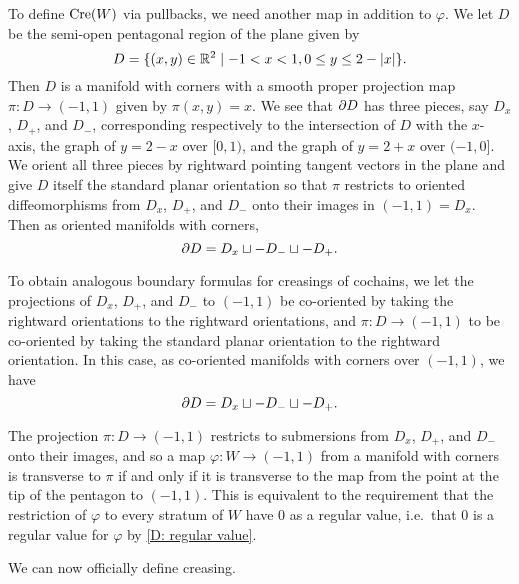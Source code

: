 To define $\mathrm{Cre}(W)$ via pullbacks, we need another map in addition to $\varphi$.
We let $D$ be the semi-open pentagonal region of the plane given by
$$D = \{(x,y) \in \mathbb{R}^2 \mid -1<x<1, 0 \leq y \leq 2-|x|\}.$$
Then $D$ is a manifold with corners with a smooth proper projection map $\pi \colon D \to (-1,1)$ given by $\pi(x,y) = x$.
We see that $\partial D$ has three pieces, say $D_x$, $D_+$, and $D_-$, corresponding respectively to the intersection of $D$ with the $x$-axis, the graph of $y = 2-x$ over $[0,1)$, and the graph of $y = 2+x$ over $(-1, 0]$.
We orient all three pieces by rightward pointing tangent vectors in the plane and give $D$ itself the standard planar orientation so that $\pi$ restricts to oriented diffeomorphisms from $D_x$, $D_+$, and $D_-$ onto their images in $(-1,1) = D_x$.
Then as oriented manifolds with corners, $$\partial D = D_x \sqcup -D_- \sqcup -D_+.$$

To obtain analogous boundary formulas for creasings of cochains, we let the projections of $D_x$, $D_+$, and $D_-$ to $(-1,1)$ be co-oriented by taking the rightward orientations to the rightward orientations, and $\pi \colon D \to (-1,1)$ to be co-oriented by taking the standard planar orientation to the rightward orientation.
In this case, as co-oriented manifolds with corners over $(-1,1)$, we have
$$\partial D = D_x \sqcup -D_- \sqcup -D_+.$$

The projection $\pi \colon D \to (-1,1)$ restricts to submersions from $D_x$, $D_+$, and $D_-$ onto their images, and so a map $\varphi \colon W \to (-1,1)$ from a manifold with corners is transverse to $\pi$ if and only if it is transverse to the map from the point at the tip of the pentagon to $(-1,1)$.
This is equivalent to the requirement that the restriction of $\varphi$ to every stratum of $W$ have $0$ as a regular value, i.e.\ that $0$ is a regular value for $\varphi$ by \cref{D: regular value}.

We can now officially define creasing.

